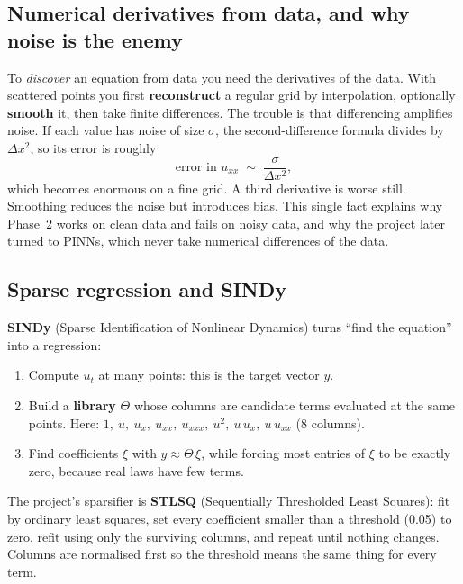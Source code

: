 \subsection{Numerical derivatives from data, and why noise is the enemy}

To \emph{discover} an equation from data you need the derivatives of the data. With scattered points you first
\textbf{reconstruct} a regular grid by interpolation, optionally \textbf{smooth} it, then take finite
differences. The trouble is that differencing amplifies noise. If each value has noise of size $\sigma$, the
second-difference formula divides by $\Delta x^2$, so its error is roughly
\[
  \text{error in } u_{xx} \;\sim\; \frac{\sigma}{\Delta x^2},
\]
which becomes enormous on a fine grid. A third derivative is worse still. Smoothing reduces the noise but
introduces bias. This single fact explains why Phase~2 works on clean data and fails on noisy data, and why the
project later turned to PINNs, which never take numerical differences of the data.

\subsection{Sparse regression and SINDy}\label{sec:sindy}

\textbf{SINDy} (Sparse Identification of Nonlinear Dynamics) turns ``find the equation'' into a regression:
\begin{enumerate}
  \item Compute $u_t$ at many points: this is the target vector $y$.
  \item Build a \textbf{library} $\Theta$ whose columns are candidate terms evaluated at the same points. Here:
        $1,\ u,\ u_x,\ u_{xx},\ u_{xxx},\ u^2,\ u\,u_x,\ u\,u_{xx}$ (8 columns).
  \item Find coefficients $\xi$ with $y \approx \Theta\,\xi$, while forcing most entries of $\xi$ to be exactly
        zero, because real laws have few terms.
\end{enumerate}
The project's sparsifier is \textbf{STLSQ} (Sequentially Thresholded Least Squares): fit by ordinary least
squares, set every coefficient smaller than a threshold (0.05) to zero, refit using only the surviving
columns, and repeat until nothing changes. Columns are normalised first so the threshold means the same thing
for every term.

